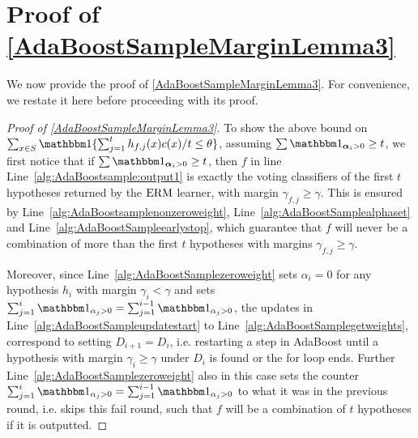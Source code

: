 \section{Proof of \cref{AdaBoostSampleMarginLemma3}}\label{appendixpropertiesadaboossample}
We now provide the proof of \cref{AdaBoostSampleMarginLemma3}. For convenience, we restate it here before proceeding with its proof.

\AdaBoostSampleMarginLemmathree*

\begin{proof}[Proof of \cref{AdaBoostSampleMarginLemma3}]
    To show the above bound on $\sum_{x\in S} \ind\{\sum_{j=1}^{t} h_{f,j}(x)c(x)/t\leq \theta \} $, assuming $\sum \ind_{\alphar_i>0}\geq t$, we first notice that if $\sum \ind_{\alphar_i>0}\geq t$, then $f$ in line Line~\ref{alg:AdaBoostsample:output1} is exactly the voting classifiers of the first $t$ hypotheses returned by the $ \mathrm{ERM} $  learner, with margin $\gamma_{f,j}\geq \gamma$. This is ensured by Line~\ref{alg:AdaBoostsamplenonzeroweight}, Line~\ref{alg:AdaBoostSamplealphaset} and Line~\ref{alg:AdaBoostSampleearlystop}, which guarantee that $f$ will never be a combination of more than the first $t$ hypotheses with margins $\gamma_{f,j}\geq \gamma$. 
    
    Moreover, since Line~\ref{alg:AdaBoostSamplezeroweight} sets $\alpha_{i}=0$ for any hypothesis $h_i$ with margin $\gamma_{i}<\gamma$ and sets $\sum_{j=1}^{i}\ind_{\alpha_j>0}=\sum_{j=1}^{i-1}\ind_{\alpha_j>0}  $, the updates in Line~\ref{alg:AdaBoostSampleupdatestart} to Line~\ref{alg:AdaBoostSamplegetweights}, correspond to setting $D_{i+1}=D_{i}$, i.e. restarting a step in AdaBoost until a hypothesis with margin $\gamma_{i}\geq \gamma$ under $D_{i}$ is found or the for loop ends. Further Line~\ref{alg:AdaBoostSamplezeroweight} also in this case sets the counter $\sum_{j=1}^{i}\ind_{\alpha_j>0}=\sum_{j=1}^{i-1}\ind_{\alpha_j>0}$ to what it was in the previous round, i.e. skips this fail round, such that $ f $ will be a combination of $ t $ hypotheses if it is outputted.  
    

\end{proof}
